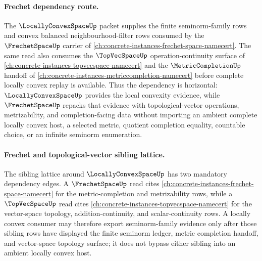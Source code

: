 \paragraph{Frechet dependency route.}
The $\LocallyConvexSpaceUp$ packet supplies the finite seminorm-family rows and convex balanced neighbourhood-filter rows consumed by the $\FrechetSpaceUp$ carrier of \autoref{ch:concrete-instances-frechet-space-namecert}. The same read also consumes the $\TopVecSpaceUp$ operation-continuity surface of \autoref{ch:concrete-instances-topvecspace-namecert} and the $\MetricCompletionUp$ handoff of \autoref{ch:concrete-instances-metriccompletion-namecert} before complete locally convex replay is available. Thus the dependency is horizontal: $\LocallyConvexSpaceUp$ provides the local convexity evidence, while $\FrechetSpaceUp$ repacks that evidence with topological-vector operations, metrizability, and completion-facing data without importing an ambient complete locally convex host, a selected metric, quotient completion equality, countable choice, or an infinite seminorm enumeration.

\paragraph{Frechet and topological-vector sibling lattice.}
The sibling lattice around $\LocallyConvexSpaceUp$ has two mandatory dependency edges. A $\FrechetSpaceUp$ read cites \autoref{ch:concrete-instances-frechet-space-namecert} for the metric-completion and metrizability rows, while a $\TopVecSpaceUp$ read cites \autoref{ch:concrete-instances-topvecspace-namecert} for the vector-space topology, addition-continuity, and scalar-continuity rows. A locally convex consumer may therefore export seminorm-family evidence only after those sibling rows have displayed the finite seminorm ledger, metric completion handoff, and vector-space topology surface; it does not bypass either sibling into an ambient locally convex host.
